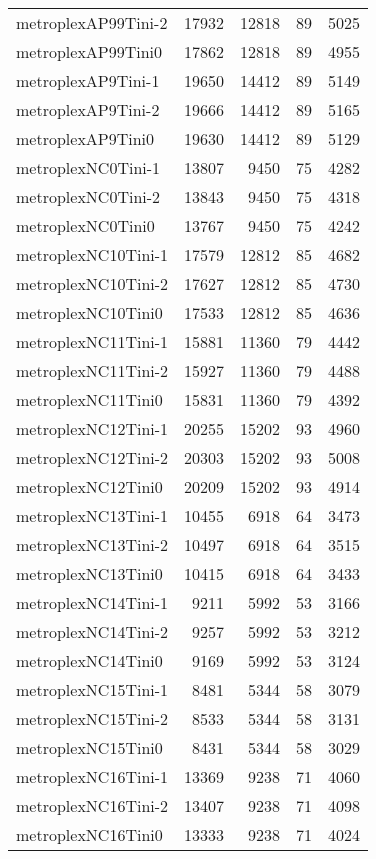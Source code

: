 \begin{longtable}{lrrrr}
metroplexAP99Tini-2 & 17932 & 12818 & 89 & 5025 \\
metroplexAP99Tini0 & 17862 & 12818 & 89 & 4955 \\
metroplexAP9Tini-1 & 19650 & 14412 & 89 & 5149 \\
metroplexAP9Tini-2 & 19666 & 14412 & 89 & 5165 \\
metroplexAP9Tini0 & 19630 & 14412 & 89 & 5129 \\
metroplexNC0Tini-1 & 13807 & 9450 & 75 & 4282 \\
metroplexNC0Tini-2 & 13843 & 9450 & 75 & 4318 \\
metroplexNC0Tini0 & 13767 & 9450 & 75 & 4242 \\
metroplexNC10Tini-1 & 17579 & 12812 & 85 & 4682 \\
metroplexNC10Tini-2 & 17627 & 12812 & 85 & 4730 \\
metroplexNC10Tini0 & 17533 & 12812 & 85 & 4636 \\
metroplexNC11Tini-1 & 15881 & 11360 & 79 & 4442 \\
metroplexNC11Tini-2 & 15927 & 11360 & 79 & 4488 \\
metroplexNC11Tini0 & 15831 & 11360 & 79 & 4392 \\
metroplexNC12Tini-1 & 20255 & 15202 & 93 & 4960 \\
metroplexNC12Tini-2 & 20303 & 15202 & 93 & 5008 \\
metroplexNC12Tini0 & 20209 & 15202 & 93 & 4914 \\
metroplexNC13Tini-1 & 10455 & 6918 & 64 & 3473 \\
metroplexNC13Tini-2 & 10497 & 6918 & 64 & 3515 \\
metroplexNC13Tini0 & 10415 & 6918 & 64 & 3433 \\
metroplexNC14Tini-1 & 9211 & 5992 & 53 & 3166 \\
metroplexNC14Tini-2 & 9257 & 5992 & 53 & 3212 \\
metroplexNC14Tini0 & 9169 & 5992 & 53 & 3124 \\
metroplexNC15Tini-1 & 8481 & 5344 & 58 & 3079 \\
metroplexNC15Tini-2 & 8533 & 5344 & 58 & 3131 \\
metroplexNC15Tini0 & 8431 & 5344 & 58 & 3029 \\
metroplexNC16Tini-1 & 13369 & 9238 & 71 & 4060 \\
metroplexNC16Tini-2 & 13407 & 9238 & 71 & 4098 \\
metroplexNC16Tini0 & 13333 & 9238 & 71 & 4024 \\

\end{longtable}
